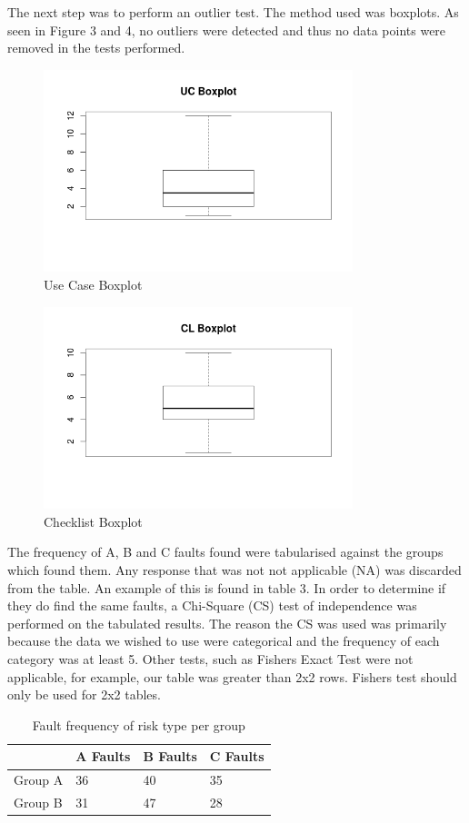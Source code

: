 \documentclass[10pt,twocolumn]{article}
\begin{document}
The next step was to perform an outlier test. The method used was boxplots. As seen in Figure 3 and 4, no outliers were detected and thus no data points were removed in the tests performed. 

\begin{figure}[ht]
\centering
\includegraphics[width=90mm]{uc_box.png}
\caption{Use Case Boxplot}
\end{figure}

\begin{figure}[ht]
\centering
\includegraphics[width=90mm]{cl_box.png}
\caption{Checklist Boxplot}
\end{figure}


The frequency of A, B and C faults found were tabularised against the groups which found them. Any response that was not not applicable (NA) was discarded from the table. An example of this is found in table 3. In order to determine if they do find the same faults, a Chi-Square (CS) test of independence was performed on the tabulated results. The reason the CS was used was primarily because the data we wished to use were categorical and the frequency of each category was at least 5. Other tests, such as Fishers Exact Test were not applicable, for example, our table was greater than 2x2 rows. Fishers test should only be used for 2x2 tables.

\begin{table}
	\centering
	\begin{tabular}[Ht]{| l | l | l | l |}
	\hline
	 & A Faults & B Faults & C Faults  \\
	\hline
	Group A & 36 & 40 & 35 \\
	\hline
	Group B & 31 & 47 & 28 \\
	\hline
	\end{tabular}
	\caption{Fault frequency of risk type per group}
\end{table}
\end{document}
